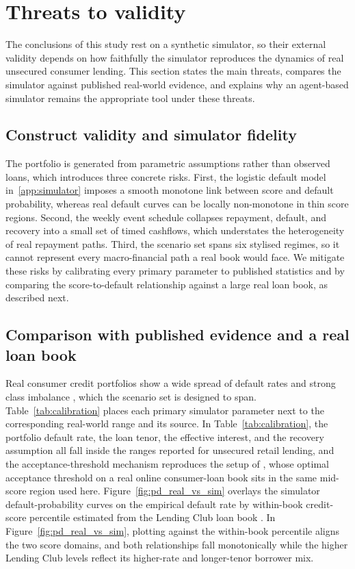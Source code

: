 \documentclass[preprint,review,authoryear,12pt]{elsarticle}
\begin{document}
\section{Threats to validity}
\label{sec:threats}
The conclusions of this study rest on a synthetic simulator, so their external validity depends on how faithfully the simulator reproduces the dynamics of real unsecured consumer lending. This section states the main threats, compares the simulator against published real-world evidence, and explains why an agent-based simulator remains the appropriate tool under these threats.

\subsection{Construct validity and simulator fidelity}
The portfolio is generated from parametric assumptions rather than observed loans, which introduces three concrete risks. First, the logistic default model in~\ref{app:simulator} imposes a smooth monotone link between score and default probability, whereas real default curves can be locally non-monotone in thin score regions. Second, the weekly event schedule collapses repayment, default, and recovery into a small set of timed cashflows, which understates the heterogeneity of real repayment paths. Third, the scenario set spans six stylised regimes, so it cannot represent every macro-financial path a real book would face. We mitigate these risks by calibrating every primary parameter to published statistics and by comparing the score-to-default relationship against a large real loan book, as described next.

\subsection{Comparison with published evidence and a real loan book}
Real consumer credit portfolios show a wide spread of default rates and strong class imbalance \citep{brownmues2012}, which the scenario set is designed to span. Table~\ref{tab:calibration} places each primary simulator parameter next to the corresponding real-world range and its source. In Table~\ref{tab:calibration}, the portfolio default rate, the loan tenor, the effective interest, and the recovery assumption all fall inside the ranges reported for unsecured retail lending, and the acceptance-threshold mechanism reproduces the setup of \citet{herasymovych2019}, whose optimal acceptance threshold on a real online consumer-loan book sits in the same mid-score region used here. Figure~\ref{fig:pd_real_vs_sim} overlays the simulator default-probability curves on the empirical default rate by within-book credit-score percentile estimated from the Lending Club loan book \citep{xia2017}. In Figure~\ref{fig:pd_real_vs_sim}, plotting against the within-book percentile aligns the two score domains, and both relationships fall monotonically while the higher Lending Club levels reflect its higher-rate and longer-tenor borrower mix.
\end{document}
